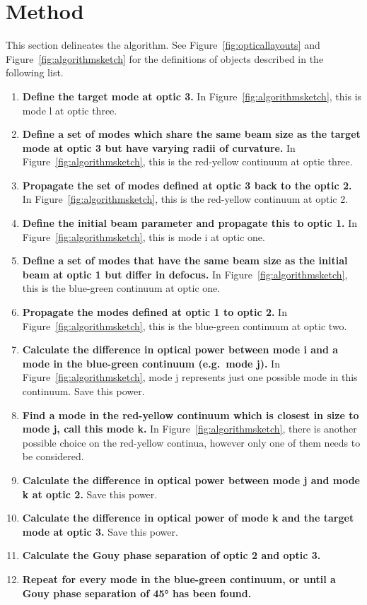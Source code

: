 \section{Method}
This section delineates the algorithm. See Figure~\ref{fig:opticallayouts} and Figure~\ref{fig:algorithmsketch} for the definitions of objects described in the following list.
\begin{enumerate}
	\item \textbf{Define the target mode at optic 3.} In Figure~\ref{fig:algorithmsketch}, this is mode l at optic three.
	\item \textbf{Define a set of modes which share the same beam size as the target mode at optic 3 but have varying radii of curvature.} In Figure~\ref{fig:algorithmsketch}, this is the red-yellow continuum at optic three.
	\item \textbf{Propagate the set of modes defined at optic 3 back to the optic 2.} In Figure~\ref{fig:algorithmsketch}, this is the red-yellow continuum at optic 2.
	\item \textbf{Define the initial beam parameter and propagate this to optic 1.} In Figure~\ref{fig:algorithmsketch}, this is mode i at optic one.
	\item \textbf{Define a set of modes that have the same beam size as the initial beam at optic 1 but differ in defocus.} In Figure~\ref{fig:algorithmsketch}, this is the blue-green continuum at optic one.
	\item \textbf{Propagate the modes defined at optic 1 to optic 2.} In Figure~\ref{fig:algorithmsketch}, this is the blue-green continuum at optic two.
	\item \textbf{Calculate the difference in optical power between mode i and a mode in the blue-green continuum (e.g.~mode j).} In Figure~\ref{fig:algorithmsketch}, mode j represents just one possible mode in this continuum. Save this power.
	\item \textbf{Find a mode in the red-yellow continuum which is closest in size to mode j, call this mode k.} In Figure~\ref{fig:algorithmsketch}, there is another possible choice on the red-yellow continua, however only one of them needs to be considered.
	\item \textbf{Calculate the difference in optical power between mode j and mode k at optic 2.} Save this power.
	\item \textbf{Calculate the difference in optical power of mode k and the target mode at optic 3.} Save this power.
	\item \textbf{Calculate the Gouy phase separation of optic 2 and optic 3.}
	\item \textbf{Repeat for every mode in the blue-green continuum, or until a Gouy phase separation of 45\si{\degree} has been found.}
\end{enumerate}
